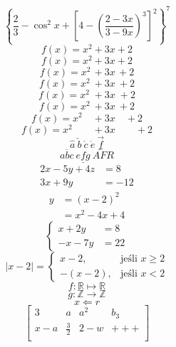 \documentclass[12pt]{article}
\begin{document}
$$\left\{ 
\frac{2}{3} - \cos ^2 x +
\left[
4-
\left(
\frac{2-3x}{3-9x}
\right)^3
\right]^2
\right\}^7
$$
$$f(x) = x^2\! +3x\! +2 $$
$$f(x) = x^2+3x+2 $$
$$f(x) = x^2\, +3x\, +2 $$
$$f(x) = x^2\: +3x\: +2 $$
$$f(x) = x^2\; +3x\; +2 $$
$$f(x) = x^2\ +3x\ +2 $$
$$f(x) = x^2\quad +3x\quad +2 $$
$$f(x) = x^2\qquad +3x\qquad +2$$
$$\hat{a} \ \check{b} \ \acute{c} \ \dot{e}
\ \vec{f}$$
$$\overline{abc} \ \underline{efg} 
\ \widetilde{AFR}$$
\begin{align*} 
2x - 5y +4z &=  8 \\ 
3x + 9y &=  -12
\end{align*}
\begin{align*}
    y &= (x-2)^2 \\
    &= x^2-4x +4
\end{align*}
$$
\begin{cases}
x+2y&=8 \\
-x-7y&=22
\end{cases}
$$
$$|x-2|=
\begin{cases}
x-2, &\text{jeśli } x\geqslant 2\\
-(x-2), &\text{jeśli } x<2
\end{cases}$$
$$f:\mathbb{R} \mapsto \mathbb{R}$$
$$g: \mathbb{Z} \rightarrow \mathbb{Z}$$
$$x\Leftarrow r$$
$$ \left[
\begin{array}{l|cc|c} 
  3   & a           & a^2 & b_3 \\
  x-a & \frac{3}{2} & 2-w & +++ \\
\end{array} \right]
$$
\end{document}
